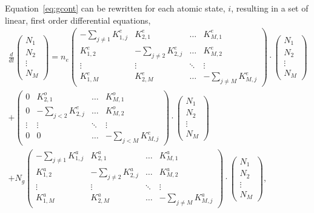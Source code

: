 Equation~\ref{eq:gcont} can be rewritten for each atomic state, $i$, resulting
in a set of linear, first order differential equations,
\begin{multline}
  \frac{d}{dt}
  \begin{pmatrix}
    N_1 \\
    N_2 \\
    \vdots \\
    N_M
  \end{pmatrix}
  = n_e
  \begin{pmatrix}
    -\sum_{j\neq 1}K^e_{1,j} & K^e_{2,1}      & \hdots & K^e_{M,1} \\
    K^e_{1,2}      & -\sum_{j\neq 2}K^e_{2,j} & \hdots & K^e_{M,2} \\
    \vdots         & \vdots         & \ddots & \vdots    \\
    K^e_{1,M}      & K^e_{2,M}      & \hdots & -\sum_{j\neq M}K^e_{M,j}
  \end{pmatrix}
  \cdot
  \begin{pmatrix}
    N_1 \\
    N_2 \\
    \vdots \\
    N_M
  \end{pmatrix} \\
  +
  \begin{pmatrix}
    0      & K^o_{2,1}              & \hdots & K^o_{M,1} \\
    0      & -\sum_{j < 2}K^e_{2,j} & \hdots & K^o_{M,2} \\
    \vdots & \vdots                 & \ddots & \vdots    \\
    0      & 0                      & \hdots & -\sum_{j < M}K^e_{M,j}
  \end{pmatrix}
  \cdot
  \begin{pmatrix}
    N_1 \\
    N_2 \\
    \vdots \\
    N_M
  \end{pmatrix} \\
  + N_g
  \begin{pmatrix}
    -\sum_{j\neq 1}K^a_{1,j} & K^a_{2,1}      & \hdots & K^a_{M,1} \\
    K^a_{1,2}      & -\sum_{j\neq 2}K^a_{2,j} & \hdots & K^a_{M,2} \\
    \vdots         & \vdots         & \ddots & \vdots    \\
    K^a_{1,M}      & K^a_{2,M}      & \hdots & -\sum_{j\neq M}K^a_{M,j}
  \end{pmatrix}
  \cdot
  \begin{pmatrix}
    N_1 \\
    N_2 \\
    \vdots \\
    N_M
  \end{pmatrix}, \\
\end{multline}
